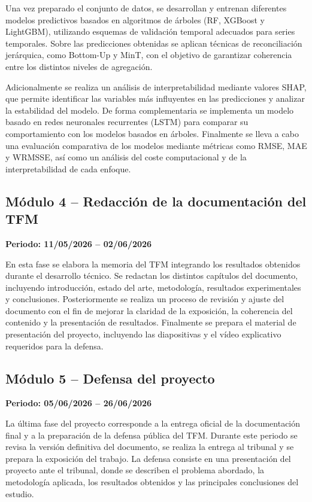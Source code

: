 \documentclass[IB,BIB]{TFUOC}%
\begin{document}
Una vez preparado el conjunto de datos, se desarrollan y entrenan
diferentes modelos predictivos basados en algoritmos de árboles
(RF, XGBoost y LightGBM), utilizando esquemas de validación temporal
adecuados para series temporales. Sobre las predicciones obtenidas se
aplican técnicas de reconciliación jerárquica, como Bottom-Up y MinT,
con el objetivo de garantizar coherencia entre los distintos niveles de
agregación.

Adicionalmente se realiza un análisis de interpretabilidad mediante
valores SHAP, que permite identificar las variables más influyentes en
las predicciones y analizar la estabilidad del modelo. De forma
complementaria se implementa un modelo basado en redes neuronales
recurrentes (LSTM) para comparar su comportamiento con los modelos
basados en árboles. Finalmente se lleva a cabo una evaluación
comparativa de los modelos mediante métricas como RMSE, MAE y WRMSSE,
así como un análisis del coste computacional y de la interpretabilidad
de cada enfoque.

\newpage
\subsection{Módulo 4 -- Redacción de la documentación del TFM}

\textbf{Periodo: 11/05/2026 -- 02/06/2026}

En esta fase se elabora la memoria del TFM integrando los resultados
obtenidos durante el desarrollo técnico. Se redactan los distintos
capítulos del documento, incluyendo introducción, estado del arte,
metodología, resultados experimentales y conclusiones. Posteriormente se
realiza un proceso de revisión y ajuste del documento con el fin de
mejorar la claridad de la exposición, la coherencia del contenido y la
presentación de resultados. Finalmente se prepara el material de
presentación del proyecto, incluyendo las diapositivas y el vídeo
explicativo requeridos para la defensa.

\subsection{Módulo 5 -- Defensa del proyecto}

\textbf{Periodo: 05/06/2026 -- 26/06/2026}

La última fase del proyecto corresponde a la entrega oficial de la
documentación final y a la preparación de la defensa pública del TFM.
Durante este periodo se revisa la versión definitiva del documento, se
realiza la entrega al tribunal y se prepara la exposición del trabajo.
La defensa consiste en una presentación del proyecto ante el tribunal,
donde se describen el problema abordado, la metodología aplicada, los
resultados obtenidos y las principales conclusiones del estudio.
\end{document}
